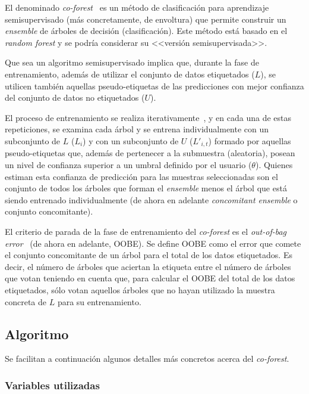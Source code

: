 El denominado \textit{co-forest}~\cite{originalCoForest2007} es un método de clasificación para aprendizaje semisupervisado (más concretamente, de envoltura) que permite construir un \textit{ensemble} de árboles de decisión (clasificación). Este método está basado en el \textit{random forest} y se podría considerar su <<versión semisupervisada>>. 

Que sea un algoritmo semisupervisado implica que, durante la fase de entrenamiento, además de utilizar el conjunto de datos etiquetados ($L$), se utilicen también aquellas pseudo-etiquetas de las predicciones con mejor confianza del conjunto de datos no etiquetados ($U$).

El proceso de entrenamiento se realiza iterativamente~\cite{engelen2018thesis}, y en cada una de estas repeticiones, se examina cada árbol y se entrena individualmente con un subconjunto de $L$ ($L_{i}$) y con un subconjunto de $U$ ($L'_{i,t}$) formado por aquellas pseudo-etiquetas que, además de pertenecer a la submuestra (aleatoria), posean un nivel de confianza superior a un umbral definido por el usuario ($\theta$). Quienes estiman esta confianza de predicción para las muestras seleccionadas son el conjunto de todos los árboles que forman el \textit{ensemble} menos el árbol que está siendo entrenado individualmente (de ahora en adelante \textit{concomitant ensemble} o conjunto concomitante).

El criterio de parada de la fase de entrenamiento del \textit{co-forest} es el \textit{out-of-bag error}~\cite{zhou2021SemisupervisedRecommendationAttack} (de ahora en adelante, OOBE). Se define OOBE como el error que comete el conjunto concomitante de un árbol para el total de los datos etiquetados. Es decir, el número de árboles que aciertan la etiqueta entre el número de árboles que votan teniendo en cuenta que, para calcular el OOBE del total de los datos etiquetados, sólo votan aquellos árboles que no hayan utilizado la muestra concreta de $L$ para su entrenamiento.


\subsection{Algoritmo}

Se facilitan a continuación algunos detalles más concretos acerca del \textit{co-forest}.

\subsubsection{Variables utilizadas}

